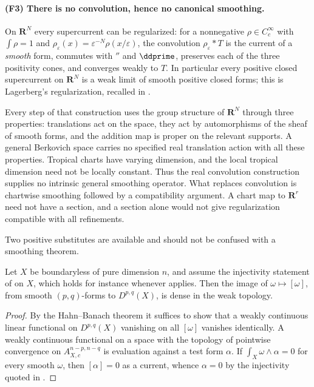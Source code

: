 \paragraph{(F3) There is no convolution, hence no canonical smoothing.}
On $\mathbf R^N$ every supercurrent can be regularized: for a nonnegative
$\rho\in C_c^\infty$ with $\int\rho=1$ and $\rho_\varepsilon(x)
=\varepsilon^{-N}\rho(x/\varepsilon)$, the convolution
$\rho_\varepsilon*T$ is the current of a \emph{smooth} form, commutes with
$\dprime$ and $\ddprime$, preserves each of the three positivity cones, and
converges weakly to $T$.  In particular every positive closed supercurrent on
$\mathbf R^N$ is a weak limit of smooth positive closed forms; this is
Lagerberg's regularization, recalled in \cite[\S1.6]{CLD25}.

Every step of that construction uses the group structure of $\mathbf R^N$
through three properties: translations act on the space, they act by
automorphisms of the sheaf of smooth forms, and the addition map is proper on
the relevant supports.  A general Berkovich space carries no specified real translation action
with all these properties. Tropical charts have varying dimension, and the
local tropical dimension need not be locally constant. Thus the real
convolution construction supplies no intrinsic general smoothing operator.  What replaces convolution is
chartwise smoothing followed by a compatibility argument. A chart map
to $\mathbf R^r$ need not have a section, and a section alone would not
give regularization compatible with all refinements.

Two positive substitutes are available and should not be confused with a
smoothing theorem.

\begin{proposition}
\label{prop:ch14-weak-density}
Let $X$ be boundaryless of pure dimension $n$, and assume the injectivity
statement of  on $X$, which holds for instance
whenever \cite[Corollary~7.3.9]{CLD25} applies.  Then the image of
$\omega\mapsto[\omega]$, from smooth $(p,q)$-forms to $D^{p,q}(X)$, is dense
in the weak topology.
\end{proposition}

\begin{proof}
By the Hahn--Banach theorem it suffices to show that a weakly continuous
linear functional on $D^{p,q}(X)$ vanishing on all $[\omega]$ vanishes
identically.  A weakly continuous functional on a space with the topology of
pointwise convergence on $A_{X,c}^{n-p,n-q}$ is evaluation against a test
form $\alpha$.  If $\int_X\omega\wedge\alpha=0$ for every smooth $\omega$,
then $[\alpha]=0$ as a current, whence $\alpha=0$ by the injectivity quoted
in .
\end{proof}

